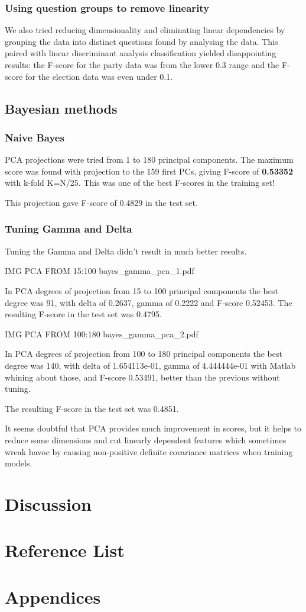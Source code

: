 \documentclass[a4paper,10pt]{article}
\begin{document}
\subsubsection{Using question groups to remove linearity}
We also tried reducing dimensionality and eliminating linear dependencies by grouping the data into distinct questions found by analysing the data. This paired with linear discriminant analysis classification yielded disappointing results: the F-score for the party data was from the lower 0.3 range and the F-score for the election data was even under 0.1.

\subsection{Bayesian methods}
\subsubsection{Naive Bayes}
PCA projections were tried from 1 to 180 principal components. The maximum score was found with projection to the 159 first PCs, giving F-score of {\bf 0.53352} with k-fold K=N/25. This was one of the best F-scores in the training set!

This projection gave F-score of 0.4829 in the test set.

\subsubsection{Tuning Gamma and Delta}
Tuning the Gamma and Delta didn’t result in much better results.

IMG PCA FROM 15:100 bayes\_gamma\_pca\_1.pdf

In PCA degrees of projection from 15 to 100 principal components the best degree was 91, with delta of 0.2637, gamma of 0.2222 and F-score 0.52453. The resulting F-score in the test set was 0.4795.

IMG PCA FROM 100:180 bayes\_gamma\_pca\_2.pdf

In PCA degrees of projection from 100 to 180 principal components the best degree was 140, with delta of 1.654113e-01, gamma of 4.444444e-01 with Matlab whining about those, and F-score 0.53491, better than the previous without tuning.

The resulting F-score in the test set was 0.4851.

It seems doubtful that PCA provides much improvement in scores, but it helps to reduce some dimensions and cut linearly dependent features which sometimes wreak havoc by causing non-positive definite covariance matrices when training models.

\section{Discussion}
\section{Reference List}
\section{Appendices}
\end{document}
